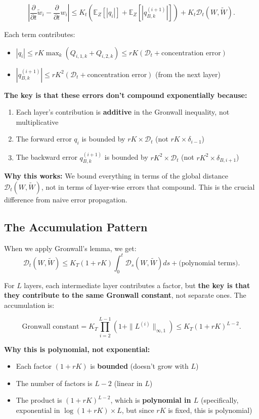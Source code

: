 \[
\left|\frac{\partial}{\partial t}\tilde{w}_i - \frac{\partial}{\partial t}w_i\right| \le K_t\left(\mathbb{E}_Z[|q_i|] + \mathbb{E}_Z[|q_{B,k}^{(i+1)}|]\right) + K_t\mathscr{D}_t(W, \tilde{W}).
\]

Each term contributes:
\begin{itemize}
\item $|q_i| \le rK \max_k(Q_{i,1,k} + Q_{i,2,k}) \le rK(\mathscr{D}_t + \text{concentration error})$
\item $|q_{B,k}^{(i+1)}| \le rK^2(\mathscr{D}_t + \text{concentration error})$ (from the next layer)
\end{itemize}

\textbf{The key is that these errors don't compound exponentially because:}
\begin{enumerate}
\item Each layer's contribution is \textbf{additive} in the Gronwall inequality, not multiplicative
\item The forward error $q_i$ is bounded by $rK \times \mathscr{D}_t$ (not $rK \times \delta_{i-1}$)
\item The backward error $q_{B,k}^{(i+1)}$ is bounded by $rK^2 \times \mathscr{D}_t$ (not $rK^2 \times \delta_{B,i+1}$)
\end{enumerate}

\textbf{Why this works:} We bound everything in terms of the global distance $\mathscr{D}_t(W, \tilde{W})$, not in terms of layer-wise errors that compound. This is the crucial difference from naive error propagation.

\subsection{The Accumulation Pattern}

When we apply Gronwall's lemma, we get:
\[
\mathscr{D}_t(W, \tilde{W}) \le K_T(1+rK)\int_0^t \mathscr{D}_s(W, \tilde{W}) ds + \text{(polynomial terms)}.
\]

For $L$ layers, each intermediate layer contributes a factor, but \textbf{the key is that they contribute to the same Gronwall constant}, not separate ones. The accumulation is:

\[
\text{Gronwall constant} = K_T \prod_{i=2}^{L-1} (1 + \|L^{(i)}\|_{\infty,1}) \le K_T(1+rK)^{L-2}.
\]

\textbf{Why this is polynomial, not exponential:}
\begin{itemize}
\item Each factor $(1+rK)$ is \textbf{bounded} (doesn't grow with $L$)
\item The number of factors is $L-2$ (linear in $L$)
\item The product is $(1+rK)^{L-2}$, which is \textbf{polynomial in $L$} (specifically, exponential in $\log(1+rK) \times L$, but since $rK$ is fixed, this is polynomial)
\end{itemize}

